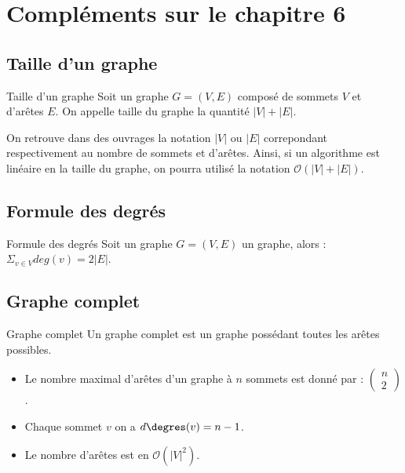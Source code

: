 \section{Compléments sur le chapitre 6}

\subsection{Taille d'un graphe}

\begin{defi}{Taille d'un graphe}
Soit un graphe $G=\left(V,E\right)$ composé de sommets $V$ et d'arêtes $E$. On appelle taille du graphe la quantité $|V|+|E|$.
\end{defi}

\begin{rem}
On retrouve dans des ouvrages la notation $|V|$ ou $|E|$ correpondant respectivement au nombre de sommets et d'arêtes. 
Ainsi, si un algorithme est linéaire en la taille du graphe, on pourra utilisé la notation $\mathcal{O}\left(|V|+|E|\right)$.
\end{rem}

\subsection{Formule des degrés}
\begin{defi}{Formule des degrés}
Soit un graphe $G=\left(V,E\right)$ un graphe, alors : $\Sigma_{v \in V} deg(v) = 2|E|$.
\end{defi}

\subsection{Graphe complet}

\begin{defi}{Graphe complet}
Un graphe complet est un graphe possédant toutes les arêtes possibles. 
\end{defi}

\begin{rem}
\begin{itemize}
\item Le nombre maximal d'arêtes d'un graphe à $n$ sommets est donné par : $\begin{pmatrix} n \\ 2\end{pmatrix}$.
\item Chaque sommet $v$ on a $d\degres (v) = n-1$.
\item Le nombre d'arêtes est en $\mathcal{O}\left(|V|^2\right)$.
\end{itemize}
\end{rem}

